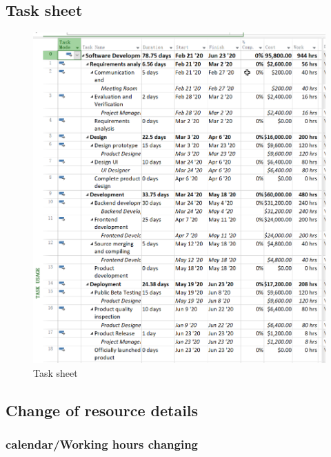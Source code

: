 \documentclass[runningheads]{llncs}
\begin{document}
\subsection{Task sheet}
\begin{figure}[H]
    \centering
    \includegraphics[width=1.0\textwidth]{./image/figure7}
    \caption{Task sheet}
    \label{}
\end{figure}

\subsection{Change of resource details}
\subsubsection{calendar/Working hours changing }
\end{document}
